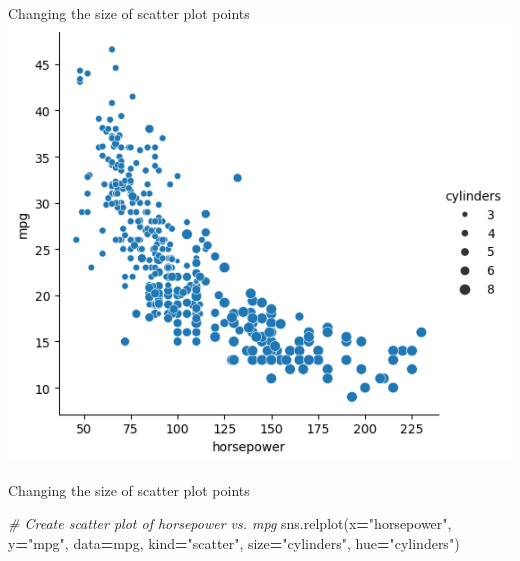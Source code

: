 \documentclass[
  ignorenonframetext,
]{beamer}
\newenvironment{Shaded}{\begin{snugshade}}{\end{snugshade}}
\newcommand{\CommentTok}[1]{\textcolor[rgb]{0.56,0.35,0.01}{\textit{#1}}}
\newcommand{\NormalTok}[1]{#1}
\newcommand{\OperatorTok}[1]{\textcolor[rgb]{0.81,0.36,0.00}{\textbf{#1}}}
\newcommand{\StringTok}[1]{\textcolor[rgb]{0.31,0.60,0.02}{#1}}
\begin{document}
\begin{frame}{Changing the size of scatter plot points}
\label{changing-the-size-of-scatter-plot-points-6}
\includegraphics{../images/im268.png}
\end{frame}

\begin{frame}[fragile]{Changing the size of scatter plot points}
\label{changing-the-size-of-scatter-plot-points-7}

\begin{Shaded}
\begin{Highlighting}[]
\CommentTok{\# Create scatter plot of horsepower vs. mpg}
\NormalTok{sns.relplot(x}\OperatorTok{=}\StringTok{"horsepower"}\NormalTok{, y}\OperatorTok{=}\StringTok{"mpg"}\NormalTok{, }
\NormalTok{            data}\OperatorTok{=}\NormalTok{mpg, kind}\OperatorTok{=}\StringTok{"scatter"}\NormalTok{, }
\NormalTok{            size}\OperatorTok{=}\StringTok{"cylinders"}\NormalTok{, hue}\OperatorTok{=}\StringTok{"cylinders"}\NormalTok{)}
\end{Highlighting}
\end{Shaded}
\end{frame}
\end{document}

